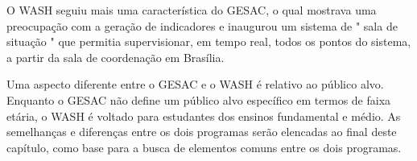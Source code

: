 O WASH seguiu mais uma característica do GESAC, o qual  mostrava uma preocupação com a geração de indicadores e inaugurou um sistema de " sala de situação " que permitia supervisionar, em tempo real, todos os pontos do sistema, a partir da sala de coordenação em Brasília.


\noindent\begin{center}\mbox{\centering{}}\end{center}


Uma aspecto diferente entre o GESAC e o WASH é relativo ao público alvo. Enquanto o GESAC não define um público alvo específico em termos de faixa etária, o WASH é voltado para estudantes dos ensinos fundamental e médio. As semelhanças e diferenças entre os dois programas serão elencadas ao final deste capítulo, como base para a busca de elementos comuns entre os dois programas.



